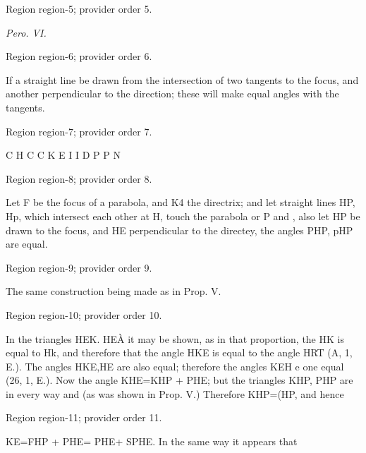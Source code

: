 \documentclass[11pt]{article}
\begin{document}
{\scriptsize\color{gray} Region region-5; provider order 5.\par}
\medskip

{\small\itshape Pero. VI.\par}

{\scriptsize\color{gray} Region region-6; provider order 6.\par}
\medskip

If a straight line be drawn from the intersection of two tangents to the focus, and another perpendicular to the direction; these will make equal angles with the tangents.
\par

{\scriptsize\color{gray} Region region-7; provider order 7.\par}
\medskip

C
H
C
C
K
E
I
I
D
P
P
N
\par

{\scriptsize\color{gray} Region region-8; provider order 8.\par}
\medskip

Let F be the focus of a parabola, and K4 the directrix; and let straight lines HP, Hp, which intersect each other at H, touch the parabola or P and , also let HP be drawn to the focus, and HE perpendicular to the directey, the angles PHP, pHP are equal.
\par

{\scriptsize\color{gray} Region region-9; provider order 9.\par}
\medskip

The same construction being made as in Prop. V.
\par

{\scriptsize\color{gray} Region region-10; provider order 10.\par}
\medskip

In the triangles HEK. HEÀ it may be shown, as in that proportion, the HK is equal to Hk, and therefore that the angle HKE is equal to the angle HRT (A, 1, E.). The angles HKE,HE are also equal; therefore the angles KEH e one equal (26, 1, E.). Now the angle KHE=KHP + PHE; but the triangles KHP, PHP are in every way and (as was shown in Prop. V.) Therefore KHP=(HP, and hence
\par

{\scriptsize\color{gray} Region region-11; provider order 11.\par}
\medskip

KE=FHP + PHE= PHE+ SPHE. In the same way it appears that
\par
\end{document}
